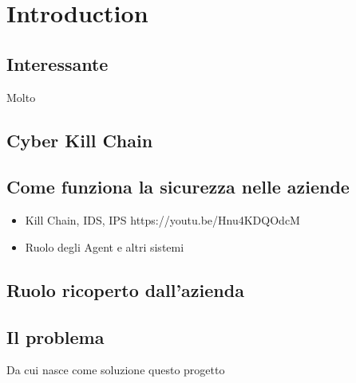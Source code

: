 \chapter{Introduction}

\section{Interessante}
Molto \cite{aws_inforce_malware}

\section{Cyber Kill Chain}

\section{Come funziona la sicurezza nelle aziende}
\begin{itemize}
    \item Kill Chain, IDS, IPS https://youtu.be/Hnu4KDQOdcM
    \item Ruolo degli Agent e altri sistemi
\end{itemize}

\section{Ruolo ricoperto dall'azienda}

\section{Il problema}
Da cui nasce come soluzione questo progetto